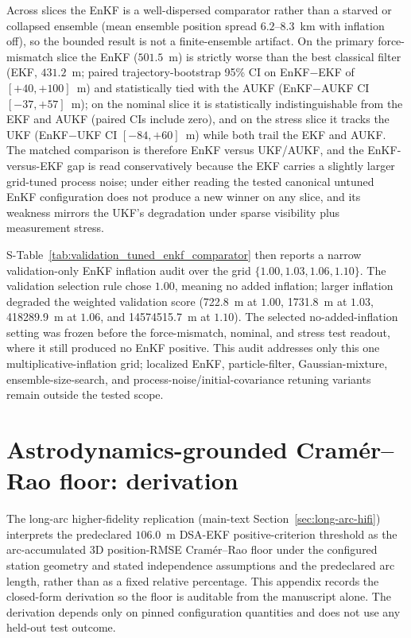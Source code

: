 \documentclass{article}
\begin{document}
Across slices the EnKF is a well-dispersed comparator rather than a starved or collapsed ensemble (mean ensemble position spread $6.2$--$8.3$~km with inflation off), so the bounded result is not a finite-ensemble artifact. On the primary force-mismatch slice the EnKF ($501.5$~m) is strictly worse than the best classical filter (EKF, $431.2$~m; paired trajectory-bootstrap 95\% CI on EnKF$-$EKF of $[+40,+100]$~m) and statistically tied with the AUKF (EnKF$-$AUKF CI $[-37,+57]$~m); on the nominal slice it is statistically indistinguishable from the EKF and AUKF (paired CIs include zero), and on the stress slice it tracks the UKF (EnKF$-$UKF CI $[-84,+60]$~m) while both trail the EKF and AUKF. The matched comparison is therefore EnKF versus UKF/AUKF, and the EnKF-versus-EKF gap is read conservatively because the EKF carries a slightly larger grid-tuned process noise; under either reading the tested canonical untuned EnKF configuration does not produce a new winner on any slice, and its weakness mirrors the UKF's degradation under sparse visibility plus measurement stress.

S-Table~\ref{tab:validation_tuned_enkf_comparator} then reports a narrow validation-only EnKF inflation audit over the grid \(\{1.00,1.03,1.06,1.10\}\). The validation selection rule chose \(1.00\), meaning no added inflation; larger inflation degraded the weighted validation score (722.8~m at \(1.00\), 1731.8~m at \(1.03\), 418289.9~m at \(1.06\), and 14574515.7~m at \(1.10\)). The selected no-added-inflation setting was frozen before the force-mismatch, nominal, and stress test readout, where it still produced no EnKF positive. This audit addresses only this one multiplicative-inflation grid; localized EnKF, particle-filter, Gaussian-mixture, ensemble-size-search, and process-noise/initial-covariance retuning variants remain outside the tested scope.



\section{Astrodynamics-grounded Cram\'er--Rao floor: derivation}
\label{app:crlb-derivation}

The long-arc higher-fidelity replication (main-text Section~\ref{sec:long-arc-hifi}) interprets the predeclared $106.0$~m DSA-EKF positive-criterion threshold as the arc-accumulated 3D position-RMSE Cram\'er--Rao floor under the configured station geometry and stated independence assumptions and the predeclared arc length, rather than as a fixed relative percentage. This appendix records the closed-form derivation so the floor is auditable from the manuscript alone. The derivation depends only on pinned configuration quantities and does not use any held-out test outcome.
\end{document}
